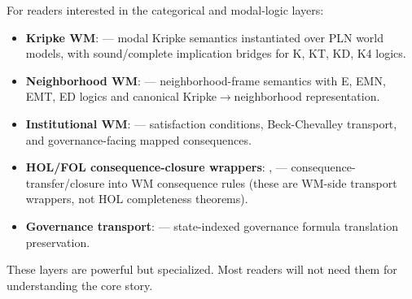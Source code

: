 \documentclass[11pt,openany]{report}
\begin{document}
For readers interested in the categorical and modal-logic layers:

\begin{itemize}
\item \textbf{Kripke WM}: ---
  modal Kripke semantics instantiated over PLN world models, with sound/complete
  implication bridges for K, KT, KD, K4 logics.

\item \textbf{Neighborhood WM}: ---
  neighborhood-frame semantics with E, EMN, EMT, ED logics and canonical
  Kripke$\to$neighborhood representation.

\item \textbf{Institutional WM}: ---
  satisfaction conditions, Beck-Chevalley transport, and governance-facing
  mapped consequences.

\item \textbf{HOL/FOL consequence-closure wrappers}: ,
  ---
  consequence-transfer/closure into WM consequence rules (these are WM-side
  transport wrappers, not HOL completeness theorems).

\item \textbf{Governance transport}: ---
  state-indexed governance formula translation preservation.
\end{itemize}

These layers are powerful but specialized.  Most readers will not need them
for understanding the core \xiPLN{} story.




\end{document}
